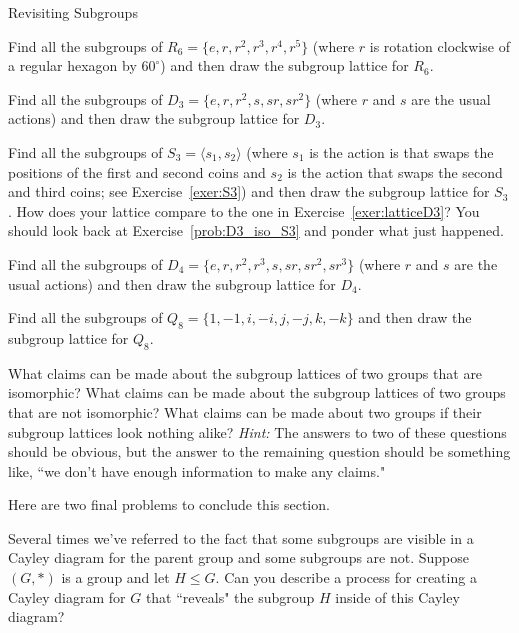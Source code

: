 \begin{section}{Revisiting Subgroups}
\begin{exercise}
Find all the subgroups of $R_6=\{e,r,r^2,r^3,r^4,r^5\}$ (where $r$ is rotation clockwise of a regular hexagon by $60^{\circ}$) and then draw the subgroup lattice for $R_6$.
\end{exercise}

\begin{exercise}\label{exer:latticeD3}
Find all the subgroups of $D_3=\{e,r,r^2,s,sr,sr^2\}$ (where $r$ and $s$ are the usual actions) and then draw the subgroup lattice for $D_3$.
\end{exercise}

\begin{exercise}
Find all the subgroups of $S_3=\langle s_1, s_2\rangle$ (where $s_1$ is the action is that swaps the positions of the first and second coins and $s_2$ is the action that swaps the second and third coins; see Exercise~\ref{exer:S3}) and then draw the subgroup lattice for $S_3$. How does your lattice compare to the one in Exercise~\ref{exer:latticeD3}? You should look back at Exercise~\ref{prob:D3_iso_S3} and ponder what just happened.
\end{exercise}

\begin{exercise}
Find all the subgroups of $D_4=\{e,r,r^2,r^3,s,sr,sr^2,sr^3\}$ (where $r$ and $s$ are the usual actions) and then draw the subgroup lattice for $D_4$.
\end{exercise}

\begin{exercise}
Find all the subgroups of $Q_8=\{1,-1,i,-i,j,-j,k,-k\}$ and then draw the subgroup lattice for $Q_8$.
\end{exercise}

\begin{problem}
What claims can be made about the subgroup lattices of two groups that are isomorphic? What claims can be made about the subgroup lattices of two groups that are not isomorphic?  What claims can be made about two groups if their subgroup lattices look nothing alike?  \emph{Hint:} The answers to two of these questions should be obvious, but the answer to the remaining question should be something like, ``we don't have enough information to make any claims."
\end{problem}

Here are two final problems to conclude this section.

\begin{problem}
Several times we've referred to the fact that some subgroups are visible in a Cayley diagram for the parent group and some subgroups are not.  Suppose $(G,*)$ is a group and let $H\leq G$.  Can you describe a process for creating a Cayley diagram for $G$ that ``reveals" the subgroup $H$ inside of this Cayley diagram?
\end{problem}


\end{section}

